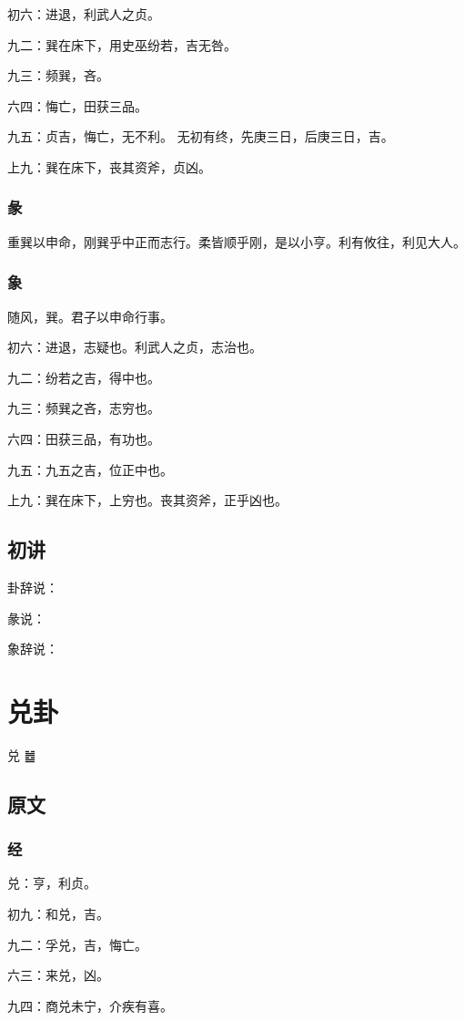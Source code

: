 \documentclass[12pt,oneside]{book}
\begin{document}
初六：进退，利武人之贞。

九二：巽在床下，用史巫纷若，吉无咎。

九三：频巽，吝。

六四：悔亡，田获三品。

九五：贞吉，悔亡，无不利。 无初有终，先庚三日，后庚三日，吉。

上九：巽在床下，丧其资斧，贞凶。

\subsection{彖}
重巽以申命，刚巽乎中正而志行。柔皆顺乎刚，是以小亨。利有攸往，利见大人。

\subsection{象}
随风，巽。君子以申命行事。

初六：进退，志疑也。利武人之贞，志治也。

九二：纷若之吉，得中也。

九三：频巽之吝，志穷也。

六四：田获三品，有功也。

九五：九五之吉，位正中也。

上九：巽在床下，上穷也。丧其资斧，正乎凶也。

\section{初讲}
卦辞说：

彖说：

象辞说：


\chapter{兑卦}
兑 {\Large ䷹}

\section{原文}

\subsection{经}
兑：亨，利贞。

初九：和兑，吉。

九二：孚兑，吉，悔亡。

六三：来兑，凶。

九四：商兑未宁，介疾有喜。
\end{document}
